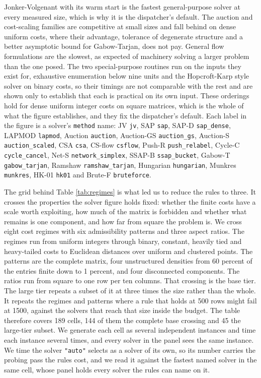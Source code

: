 Jonker-Volgenant with its warm start is the fastest general-purpose solver at
every measured size, which is why it is the dispatcher's default. The auction and cost-scaling families are competitive at small sizes and fall
behind on dense uniform costs, where their advantage, tolerance of degenerate
structure and a better asymptotic bound for Gabow-Tarjan, does not pay.
General flow formulations are the slowest, as expected of machinery solving a
larger problem than the one posed. The two special-purpose routines run on the inputs they exist for, exhaustive
enumeration below nine units and the Hopcroft-Karp style solver on binary
costs, so their timings are not comparable with the rest and are shown only to
establish that each is practical on its own input. These orderings hold for
dense uniform integer costs on square matrices, which is the whole of what the
figure establishes, and they fix the dispatcher's default. Each label in the
figure is a solver's \texttt{method} name: JV \texttt{jv}, SAP \texttt{sap}, SAP-D \texttt{sap\_dense},
LAPMOD \texttt{lapmod}, Auction \texttt{auction}, Auction-GS \texttt{auction\_gs}, Auction-S
\texttt{auction\_scaled}, CSA \texttt{csa}, CS-flow \texttt{csflow}, Push-R \texttt{push\_relabel}, Cycle-C
\texttt{cycle\_cancel}, Net-S \texttt{network\_simplex}, SSAP-B \texttt{ssap\_bucket}, Gabow-T
\texttt{gabow\_tarjan}, Ramshaw \texttt{ramshaw\_tarjan}, Hungarian \texttt{hungarian}, Munkres
\texttt{munkres}, HK-01 \texttt{hk01} and Brute-F \texttt{bruteforce}.

The grid behind Table \ref{tab:regimes} is what led us to reduce the rules to three.
It crosses the properties the solver figure holds fixed: whether the finite
costs have a scale worth exploiting, how much of the matrix is forbidden and
whether what remains is one component, and how far from square the problem is.
We cross eight cost regimes with six admissibility patterns and three aspect
ratios. The regimes run from uniform integers through binary, constant,
heavily tied and heavy-tailed costs to Euclidean distances over uniform and
clustered points. The patterns are the complete matrix, four unstructured
densities from 60 percent of the entries finite down to 1 percent, and four
disconnected components. The ratios run from square to one row per ten
columns. That crossing is the base tier. The large tier repeats a
subset of it at three times the size rather than the whole. It repeats the regimes and patterns where a rule that holds at 500 rows might fail at 1500, against the
solvers that reach that size inside the budget. The table therefore covers 189 cells, 144 of them the complete base
crossing and 45 the large-tier subset. We generate each cell as
several independent instances and time each instance several times, and every
solver in the panel sees the same instance. We time the solver \texttt{"auto"} selects
as a solver of its own, so its number carries the probing pass the rules cost,
and we read it against the fastest named solver in the same cell, whose panel
holds every solver the rules can name on it.

